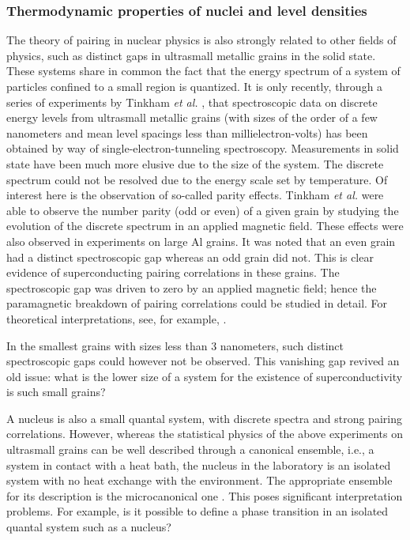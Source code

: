 \documentclass[rmp,preprint,aps,floatfix]{revtex4}
\begin{document}
\subsubsection{Thermodynamic properties of nuclei and level densities}

The theory of pairing in nuclear physics is also strongly related 
to other fields of physics, such as distinct gaps in 
ultrasmall metallic grains in the 
solid state. These systems share in 
common the fact that the energy spectrum of a system of particles 
confined to a small region is quantized. 
It is only recently, through a series of experiments by Tinkham {\em et al.}
\cite{tinkham95,tinkham96,tinkham98}, that spectroscopic data on discrete energy levels from
ultrasmall metallic grains (with sizes of the order of a few nanometers 
and mean level spacings less than millielectron-volts) 
has been
obtained by way of single-electron-tunneling spectroscopy. 
Measurements in solid state have been much more elusive due to the size
of the system. The discrete spectrum could not be resolved due to the 
energy scale set by temperature.
Of interest here is the observation of so-called parity effects. 
Tinkham {\em et al.}
\cite{tinkham95,tinkham96,tinkham98} were able to observe the number parity (odd or even)
of a given grain by studying the evolution of the discrete spectrum 
in an applied magnetic field.
These effects were also observed in experiments on large Al grains.
It was noted that an even grain had a distinct spectroscopic gap 
whereas an odd grain did not. This is clear evidence of superconducting
pairing correlations in these grains.
The spectroscopic gap was driven to zero by an applied magnetic field;
hence the paramagnetic breakdown of pairing correlations could be studied in 
detail. For theoretical interpretations, 
see, for example, \cite{delft2000,balian1999,mastellone98,sierra99}.


In the smallest grains with sizes less than 3 nanometers, such 
distinct spectroscopic gaps could however not be observed. This vanishing gap
revived an old issue: what is the lower size of a system for the existence
of superconductivity is  such small grains? 

A  nucleus is also a small quantal system, with discrete spectra and strong
pairing correlations. However, whereas the statistical physics of the
above experiments on ultrasmall
grains can be well described through a canonical ensemble, i.e., 
a system in contact with a heat bath, the nucleus in the laboratory 
is an isolated system with no heat exchange with the environment.
The appropriate ensemble for its description is the 
microcanonical one \cite{balian1999}.
This poses significant interpretation problems. For example, 
is it possible to define 
a phase transition in an isolated quantal system such as a nucleus?  
\end{document}
